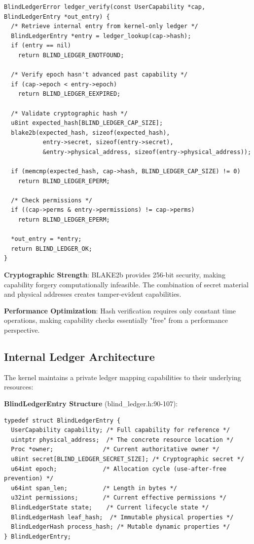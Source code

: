 \documentclass[11pt,letterpaper]{article}
\begin{document}
\begin{lstlisting}
BlindLedgerError ledger_verify(const UserCapability *cap, BlindLedgerEntry *out_entry) {
  /* Retrieve internal entry from kernel-only ledger */
  BlindLedgerEntry *entry = ledger_lookup(cap->hash);
  if (entry == nil)
    return BLIND_LEDGER_ENOTFOUND;
    
  /* Verify epoch hasn't advanced past capability */
  if (cap->epoch < entry->epoch)
    return BLIND_LEDGER_EEXPIRED;
    
  /* Validate cryptographic hash */
  u8int expected_hash[BLIND_LEDGER_CAP_SIZE];
  blake2b(expected_hash, sizeof(expected_hash), 
           entry->secret, sizeof(entry->secret),
           &entry->physical_address, sizeof(entry->physical_address));
           
  if (memcmp(expected_hash, cap->hash, BLIND_LEDGER_CAP_SIZE) != 0)
    return BLIND_LEDGER_EPERM;
    
  /* Check permissions */
  if ((cap->perms & entry->permissions) != cap->perms)
    return BLIND_LEDGER_EPERM;
    
  *out_entry = *entry;
  return BLIND_LEDGER_OK;
}
\end{lstlisting}

\textbf{Cryptographic Strength}: BLAKE2b provides 256-bit security, making capability forgery computationally infeasible. The combination of secret material and physical addresses creates tamper-evident capabilities.

\textbf{Performance Optimization}: Hash verification requires only constant time operations, making capability checks essentially "free" from a performance perspective.

\subsection{Internal Ledger Architecture}

The kernel maintains a private ledger mapping capabilities to their underlying resources:

\textbf{BlindLedgerEntry Structure} (blind\_ledger.h:90-107):

\begin{lstlisting}
typedef struct BlindLedgerEntry {
  UserCapability capability; /* Full capability for reference */
  uintptr physical_address;  /* The concrete resource location */
  Proc *owner;              /* Current authoritative owner */
  u8int secret[BLIND_LEDGER_SECRET_SIZE]; /* Cryptographic secret */
  u64int epoch;             /* Allocation cycle (use-after-free prevention) */
  u64int span_len;          /* Length in bytes */
  u32int permissions;       /* Current effective permissions */
  BlindLedgerState state;    /* Current lifecycle state */
  BlindLedgerHash leaf_hash;  /* Immutable physical properties */
  BlindLedgerHash process_hash; /* Mutable dynamic properties */
} BlindLedgerEntry;
\end{lstlisting}
\end{document}
